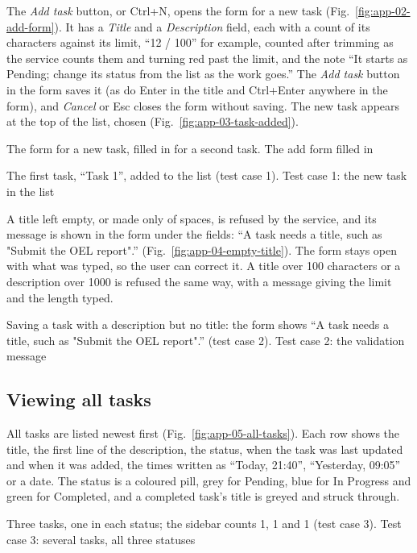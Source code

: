 The \emph{Add task} button, or Ctrl+N, opens the form for a new task (Fig.~\ref{fig:app-02-add-form}). It has a
\emph{Title} and a \emph{Description} field, each with a count of its characters against its limit, ``12 / 100'' for
example, counted after trimming as the service counts them and turning red past the limit, and the note ``It starts
as Pending; change its status from the list as the work goes.'' The \emph{Add task} button in the form saves it (as do
Enter in the title and Ctrl+Enter anywhere in the form), and \emph{Cancel} or Esc closes the form without saving. The new task appears at
the top of the list, chosen (Fig.~\ref{fig:app-03-task-added}).

  {The form for a new task, filled in for a second task.}
  {The add form filled in}

  {The first task, ``Task 1'', added to the list (test case 1).}
  {Test case 1: the new task in the list}

A title left empty, or made only of spaces, is refused by the service, and its message is shown in the form under the
fields: ``A task needs a title, such as "Submit the OEL report".'' (Fig.~\ref{fig:app-04-empty-title}). The form stays
open with what was typed, so the user can correct it. A title over 100 characters or a description over 1000 is
refused the same way, with a message giving the limit and the length typed.

  {Saving a task with a description but no title: the form shows ``A task needs a title, such as "Submit the OEL
   report".'' (test case 2).}
  {Test case 2: the validation message}

\subsection{Viewing all tasks}

All tasks are listed newest first (Fig.~\ref{fig:app-05-all-tasks}). Each row shows the title, the first line of the
description, the status, when the task was last updated and when it was added, the times written as ``Today, 21:40'',
``Yesterday, 09:05'' or a date. The status is a coloured pill, grey for Pending, blue for In Progress and green
for Completed, and a completed task's title is greyed and struck through.

  {Three tasks, one in each status; the sidebar counts 1, 1 and 1 (test case 3).}
  {Test case 3: several tasks, all three statuses}

